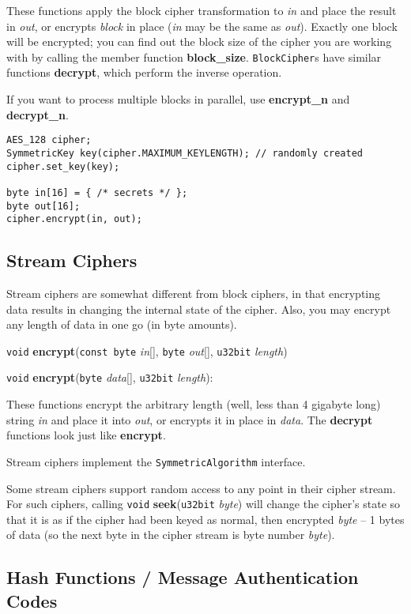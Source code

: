 \documentclass{article}
\newcommand{\function}[1]{\textbf{#1}}
\newcommand{\type}[1]{\texttt{#1}}
\renewcommand{\arg}[1]{\textsl{#1}}
\begin{document}
These functions apply the block cipher transformation to \arg{in} and
place the result in \arg{out}, or encrypts \arg{block} in place
(\arg{in} may be the same as \arg{out}). Exactly one block will be
encrypted; you can find out the block size of the cipher you are
working with by calling the member function \function{block\_size}.
\type{BlockCipher}s have similar functions \function{decrypt}, which
perform the inverse operation.

If you want to process multiple blocks in parallel, use
\function{encrypt\_n} and \function{decrypt\_n}.

\begin{verbatim}
AES_128 cipher;
SymmetricKey key(cipher.MAXIMUM_KEYLENGTH); // randomly created
cipher.set_key(key);

byte in[16] = { /* secrets */ };
byte out[16];
cipher.encrypt(in, out);
\end{verbatim}

\subsection{Stream Ciphers}

Stream ciphers are somewhat different from block ciphers, in that encrypting
data results in changing the internal state of the cipher. Also, you may
encrypt any length of data in one go (in byte amounts).

\noindent
\type{void} \function{encrypt}(\type{const byte} \arg{in}[], \type{byte}
\arg{out}[], \type{u32bit} \arg{length})

\noindent
\type{void} \function{encrypt}(\type{byte} \arg{data}[], \type{u32bit}
\arg{length}):

These functions encrypt the arbitrary length (well, less than 4 gigabyte long)
string \arg{in} and place it into \arg{out}, or encrypts it in place in
\arg{data}. The \function{decrypt} functions look just like
\function{encrypt}.

Stream ciphers implement the \type{SymmetricAlgorithm} interface.

Some stream ciphers support random access to any point in their cipher
stream. For such ciphers, calling \type{void} \function{seek}(\type{u32bit}
\arg{byte}) will change the cipher's state so that it is as if the cipher had been
keyed as normal, then encrypted \arg{byte} -- 1 bytes of data (so the next byte
in the cipher stream is byte number \arg{byte}).

\subsection{Hash Functions / Message Authentication Codes}
\end{document}
